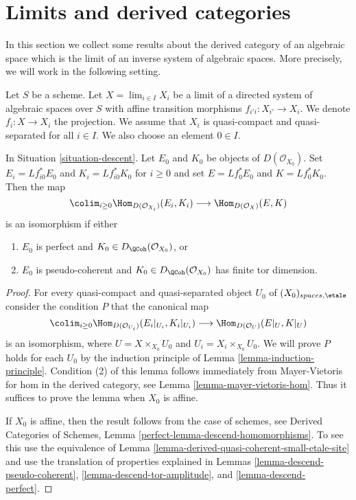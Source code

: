 \section{Limits and derived categories}
\label{section-limits}

\noindent
In this section we collect some results about the derived category
of an algebraic space which is the limit of an inverse system of
algebraic spaces. More precisely, we will work in the following setting.

\begin{situation}
\label{situation-descent}
Let $S$ be a scheme. Let $X = \lim_{i \in I} X_i$ be a limit of a directed
system of algebraic spaces over $S$ with affine transition morphisms
$f_{i'i} : X_{i'} \to X_i$. We denote $f_i : X \to X_i$ the projection.
We assume that $X_i$ is quasi-compact and quasi-separated for all $i \in I$.
We also choose an element $0 \in I$.
\end{situation}

\begin{lemma}
\label{lemma-descend-homomorphisms}
In Situation \ref{situation-descent}. Let $E_0$ and $K_0$ be objects of
$D(\mathcal{O}_{X_0})$. Set $E_i = Lf_{i0}^*E_0$ and $K_i = Lf_{i0}^*K_0$
for $i \geq 0$ and set $E = Lf_0^*E_0$ and $K = Lf_0^*K_0$. Then the map
$$
\colim_{i \geq 0} \Hom_{D(\mathcal{O}_{X_i})}(E_i, K_i)
\longrightarrow
\Hom_{D(\mathcal{O}_X)}(E, K)
$$
is an isomorphism if either
\begin{enumerate}
\item $E_0$ is perfect and $K_0 \in D_\QCoh(\mathcal{O}_{X_0})$, or
\item $E_0$ is pseudo-coherent and
$K_0 \in D_\QCoh(\mathcal{O}_{X_0})$ has finite tor dimension.
\end{enumerate}
\end{lemma}

\begin{proof}
For every quasi-compact and quasi-separated object $U_0$ of
$(X_0)_{spaces, \etale}$ consider the condition $P$ that the canonical
map
$$
\colim_{i \geq 0} \Hom_{D(\mathcal{O}_{U_i})}(E_i|_{U_i}, K_i|_{U_i})
\longrightarrow
\Hom_{D(\mathcal{O}_U)}(E|_U, K|_U)
$$
is an isomorphism, where $U = X \times_{X_0} U_0$ and
$U_i = X_i \times_{X_0} U_0$. We will prove $P$ holds for each $U_0$
by the induction principle of Lemma \ref{lemma-induction-principle}.
Condition (2) of this lemma follows immediately from Mayer-Vietoris
for hom in the derived category, see Lemma \ref{lemma-mayer-vietoris-hom}.
Thus it suffices to prove the lemma when $X_0$ is affine.

\medskip\noindent
If $X_0$ is affine, then the result follows from the case of schemes, see
Derived Categories of Schemes, Lemma \ref{perfect-lemma-descend-homomorphisms}.
To see this use the equivalence of
Lemma \ref{lemma-derived-quasi-coherent-small-etale-site}
and use the translation of properties explained in
Lemmas \ref{lemma-descend-pseudo-coherent},
\ref{lemma-descend-tor-amplitude}, and
\ref{lemma-descend-perfect}.
\end{proof}


